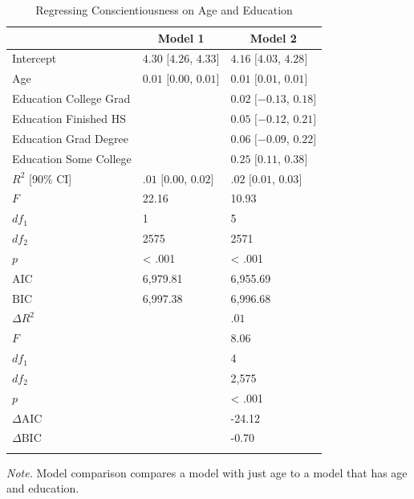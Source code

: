 \documentclass[
  english,
  man,floatsintext]{apa6}
\begin{document}
\begin{table}[tbp]

\begin{center}
\begin{threeparttable}

\caption{\label{tab:reg-models-tbl}Regressing Conscientiousness on Age and Education}

\begin{tabular}{lll}
\toprule
 & \multicolumn{1}{c}{Model 1} & \multicolumn{1}{c}{Model 2}\\
\midrule
Intercept & $4.30$ $[4.26$, $4.33]$ & $4.16$ $[4.03$, $4.28]$\\
Age & $0.01$ $[0.00$, $0.01]$ & $0.01$ $[0.01$, $0.01]$\\
Education College Grad &  & $0.02$ $[-0.13$, $0.18]$\\
Education Finished HS &  & $0.05$ $[-0.12$, $0.21]$\\
Education Grad Degree &  & $0.06$ $[-0.09$, $0.22]$\\
Education Some College &  & $0.25$ $[0.11$, $0.38]$\\
$R^2$ [90\% CI] & $.01$ $[0.00$, $0.02]$ & $.02$ $[0.01$, $0.03]$\\
$F$ & 22.16 & 10.93\\
$df_1$ & 1 & 5\\
$df_2$ & 2575 & 2571\\
$p$ & < .001 & < .001\\
$\mathrm{AIC}$ & 6,979.81 & 6,955.69\\
$\mathrm{BIC}$ & 6,997.38 & 6,996.68\\
$\Delta R^2$ &  & $.01$\\
$F$ &  & 8.06\\
$df_1$ &  & 4\\
$df_2$ &  & 2,575\\
$p$ &  & < .001\\
$\Delta \mathrm{AIC}$ &  & -24.12\\
$\Delta \mathrm{BIC}$ &  & -0.70\\
\bottomrule
\addlinespace
\end{tabular}

\begin{tablenotes}[para]
\normalsize{\textit{Note.} Model comparison compares a model with just age to a model that has age and education.}
\end{tablenotes}

\end{threeparttable}
\end{center}

\end{table}
\end{document}
